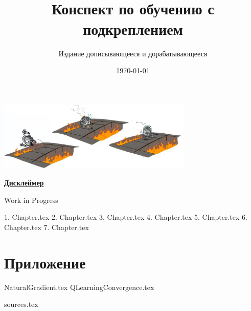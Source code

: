 \documentclass[a4paper, 10pt, oneside]{memoir}
\title{
\vspace{4cm}
\normalfont \normalsize 
\horrule{0.5pt} \\[0.4cm]
\huge Конспект по обучению с подкреплением
\horrule{2pt} \\[0.5cm]
}
\author{Издание дописывающееся и дорабатывающееся}
\date{\normalsize\today}
\begin{document}

\maketitle
\thispagestyle{empty}

\begin{center}
    \includegraphics[width=0.7\textwidth]{Images/robot.png}
\end{center}

\vspace{2cm}
\begin{center}
\textcolor{ChadBlue}{\underline{\textbf{Дисклеймер}}}

\vspace{1cm}
Work in Progress
\end{center}


\newpage
\tableofcontents*

{1. Chapter.tex}
{2. Chapter.tex}
{3. Chapter.tex}
{4. Chapter.tex}
{5. Chapter.tex}
{6. Chapter.tex}
{7. Chapter.tex}


\newpage

\appendix

\chapter{Приложение}

{NaturalGradient.tex}
{QLearningConvergence.tex}

{sources.tex}

\end{document}
